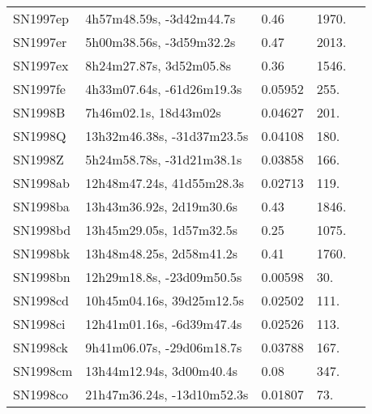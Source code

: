 \begin{longtable}{lllll}
         SN1997ep &       4h57m48.59s, -3d42m44.7s &     0.46 &          1970. &    \citet{1998IAUC.6804A...1N} \\
         SN1997er &       5h00m38.56s, -3d59m32.2s &     0.47 &          2013. &    \citet{1998IAUC.6804A...1N} \\
         SN1997ex &        8h24m27.87s, 3d52m05.8s &     0.36 &          1546. &    \citet{1998IAUC.6804A...1N} \\
         SN1997fe &      4h33m07.64s, -61d26m19.3s &  0.05952 &           255. &  \citet{2009AandA...495..707C} \\
          SN1998B &          7h46m02.1s, 18d43m02s &  0.04627 &           201. &    \citet{2005SDSS4.C...0000:} \\
          SN1998Q &     13h32m46.38s, -31d37m23.5s &  0.04108 &           180. &    \citet{2003MNRAS.339..652K} \\
          SN1998Z &      5h24m58.78s, -31d21m38.1s &  0.03858 &           166. &  \citet{1998AandAS..129..399K} \\
         SN1998ab &      12h48m47.24s, 41d55m28.3s &  0.02713 &           119. &    \citet{1995ApJS..100...69F} \\
         SN1998ba &       13h43m36.92s, 2d19m30.6s &     0.43 &          1846. &    \citet{1998IAUC.6881A...1:} \\
         SN1998bd &       13h45m29.05s, 1d57m32.5s &     0.25 &          1075. &    \citet{1998IAUC.6881A...1:} \\
         SN1998bk &       13h48m48.25s, 2d58m41.2s &     0.41 &          1760. &    \citet{1998IAUC.6881A...1:} \\
         SN1998bn &      12h29m18.8s, -23d09m50.5s &  0.00598 &            30. &  \citet{1998AandAS..130..333T} \\
         SN1998cd &      10h45m04.16s, 39d25m12.5s &  0.02502 &           111. &    \citet{2011ApJ...735..125S} \\
         SN1998ci &      12h41m01.16s, -6d39m47.4s &  0.02526 &           113. &    \citet{1998AJ....116....1D} \\
         SN1998ck &      9h41m06.07s, -29d06m18.7s &  0.03788 &           167. &    \citet{20096dF...C...0000J} \\
         SN1998cm &       13h44m12.94s, 3d00m40.4s &     0.08 &           347. &    \citet{1998IAUC.6943B...1G} \\
         SN1998co &     21h47m36.24s, -13d10m52.3s &  0.01807 &            73. &  \citet{1999AandAS..140..327M} \\

\end{longtable}

